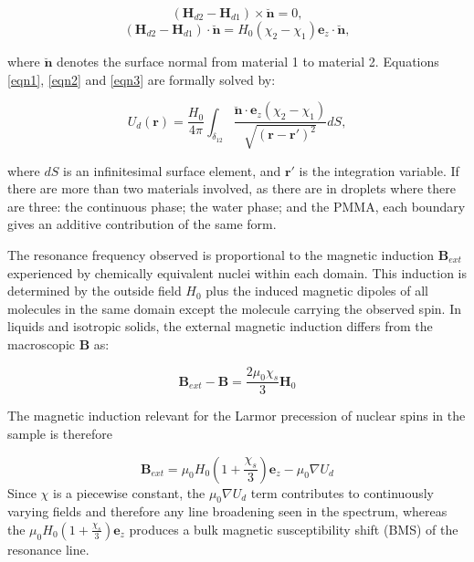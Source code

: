\begin{equation} \label{eqn2}
  (\mathbf{H}_{d2} - \mathbf{H}_{d1}) \times \breve{\mathbf{n}} = 0,
\end{equation}
\begin{equation} \label{eqn3}
    (\mathbf{H}_{d2} - \mathbf{H}_{d1}) \cdot \breve{\mathbf{n}} = H_{0}(\chi_{2} -
    \chi_{1})\mathbf{e}_{z}\cdot\breve{\mathbf{n}},
\end{equation}

where $\breve{\mathbf{n}}$ denotes the surface normal from material 1 to material 2. Equations \ref{eqn1}, \ref{eqn2}
and \ref{eqn3} are formally solved by:

\begin{equation}\label{eqn:Magnetostatic}
  U_{d}(\mathbf{r}) = \frac{H_{0}}{4\pi}\int_{\delta_{12}}\frac{\breve{\mathbf{n}}\cdot\mathbf{e}_{z}(\chi_{2}-\chi_{1})}{\sqrt{(\mathbf{r}-\mathbf{r'})^{2}}}dS,
\end{equation}

where $dS$ is an infinitesimal surface element, and $\mathbf{r'}$ is the integration variable. If there are more than two materials involved, as there are in droplets where
there are three: the continuous phase; the water phase; and the PMMA, each boundary gives an additive contribution of the same form.

The resonance frequency observed is proportional to the magnetic induction $\mathbf{B}_{ext}$
experienced by chemically equivalent nuclei within each domain. This induction is determined
by the outside field $H_{0}$ plus the induced magnetic dipoles of all molecules in the same domain except the molecule carrying
the observed spin.\citep{Levitt:1996tg} In liquids and isotropic solids, the external magnetic induction differs from the macroscopic $\mathbf{B}$ as:

\begin{equation}
  \mathbf{B}_{ext}-\mathbf{B} = \frac{2\mu_{0}\chi_{s}}{3}\mathbf{H}_{0}
\end{equation}

The magnetic induction relevant for the Larmor precession of nuclear spins in the sample is therefore

\begin{equation}\label{eqn:LarmorSpins}
  \mathbf{B}_{ext} = \mu_{0}H_{0}(1 + \frac{\chi_{s}}{3})\mathbf{e}_{z} - \mu_{0} \nabla U_{d}
\end{equation}
Since $\chi$ is a piecewise constant, the $\mu_{0} \nabla U_{d}$ term contributes to continuously varying fields
and therefore any line broadening seen in the spectrum, whereas the $\mu_{0}H_{0}(1 + \frac{\chi_{s}}{3})\mathbf{e}_{z}$
produces a bulk magnetic susceptibility shift (BMS) of the resonance line.


